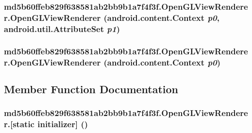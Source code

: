 \hypertarget{classmd5b60ffeb829f638581ab2bb9b1a7f4f3f_1_1_open_g_l_view_renderer_acf21ab10c0a6caa88ed7d495cca1f55}{
\subsubsection[{OpenGLViewRenderer}]{\setlength{\rightskip}{0pt plus 5cm}md5b60ffeb829f638581ab2bb9b1a7f4f3f.OpenGLViewRenderer.OpenGLViewRenderer (android.content.Context {\em p0}, \/  android.util.AttributeSet {\em p1})}}
\label{classmd5b60ffeb829f638581ab2bb9b1a7f4f3f_1_1_open_g_l_view_renderer_acf21ab10c0a6caa88ed7d495cca1f55}


\hypertarget{classmd5b60ffeb829f638581ab2bb9b1a7f4f3f_1_1_open_g_l_view_renderer_af6cac6430c4b077a72790d407622dcb}{
\subsubsection[{OpenGLViewRenderer}]{\setlength{\rightskip}{0pt plus 5cm}md5b60ffeb829f638581ab2bb9b1a7f4f3f.OpenGLViewRenderer.OpenGLViewRenderer (android.content.Context {\em p0})}}
\label{classmd5b60ffeb829f638581ab2bb9b1a7f4f3f_1_1_open_g_l_view_renderer_af6cac6430c4b077a72790d407622dcb}




\subsection{Member Function Documentation}
\hypertarget{classmd5b60ffeb829f638581ab2bb9b1a7f4f3f_1_1_open_g_l_view_renderer_4e0925629cda86b2b3a4e354456f87b6}{
\subsubsection[{[static initializer]}]{\setlength{\rightskip}{0pt plus 5cm}md5b60ffeb829f638581ab2bb9b1a7f4f3f.OpenGLViewRenderer.\mbox{[}static initializer\mbox{]} ()}}
\label{classmd5b60ffeb829f638581ab2bb9b1a7f4f3f_1_1_open_g_l_view_renderer_4e0925629cda86b2b3a4e354456f87b6}




